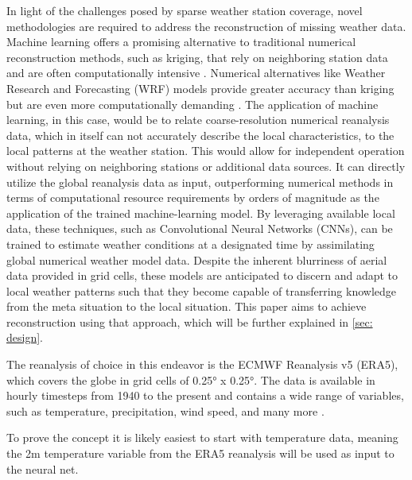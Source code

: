 
In light of the challenges posed by sparse weather station coverage, novel methodologies are required to address the reconstruction of missing weather data.
Machine learning offers a promising alternative to traditional numerical reconstruction methods, such as kriging, that rely on neighboring station data and are often computationally intensive \cite{chung2019kriging}. Numerical alternatives like Weather Research and Forecasting (WRF) models provide greater accuracy than kriging but are even more computationally demanding \cite{skamarock2008wrf}.
The application of machine learning, in this case, would be to relate coarse-resolution numerical reanalysis data, which in itself can not accurately describe the local characteristics, to the local patterns at the weather station.
This would allow for independent operation without relying on neighboring stations or additional data sources. It can directly utilize the global reanalysis data as input, outperforming numerical methods in terms of computational resource requirements by orders of magnitude \cite{kurth2023MLperformance,bi2023MLperformance,lam2023MLperformance} as the application of the trained machine-learning model.
By leveraging available local data, these techniques, such as Convolutional Neural Networks (CNNs), can be trained to estimate weather conditions at a designated time by assimilating global numerical weather model data.
Despite the inherent blurriness of aerial data provided in grid cells, these models are anticipated to discern and adapt to local weather patterns such that they become capable of transferring knowledge from the meta situation to the local situation.
This paper aims to achieve reconstruction using that approach, which will be further explained in \autoref{sec: design}.


The reanalysis of choice in this endeavor is the ECMWF Reanalysis v5 (ERA5), which covers the globe in grid cells of 0.25° x 0.25°.
The data is available in hourly timesteps from 1940 to the present and contains a wide range of variables, such as temperature, precipitation, wind speed, and many more \cite{era5}.


To prove the concept it is likely easiest to start with temperature data, meaning the 2m temperature variable from the ERA5 reanalysis will be used as input to the neural net.

